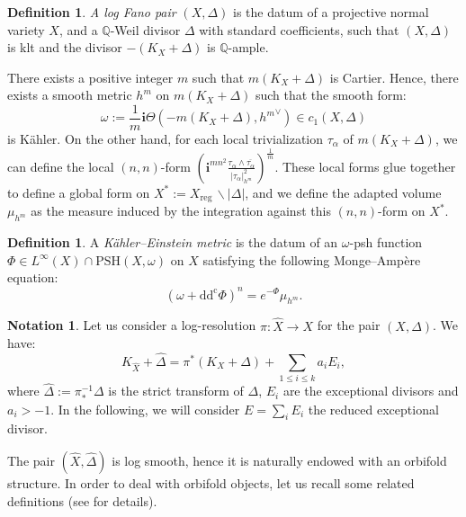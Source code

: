 \documentclass[12pt,a4paper]{amsart}
\newcommand{\Q}{\mathbb{Q}}
\newcommand{\reg}{\mathrm{reg}\,}
\newcommand{\ddc}{\mathrm{dd^c}}
\theoremstyle{plain}
\theoremstyle{definition}
\newtheorem{defi}[theo]{Definition}
\newtheorem{nota}[theo]{Notation}
\begin{document}
\begin{defi}
    \emph{A log Fano pair} $(X, \Delta)$ is the datum of a projective normal variety $X$, and a $\Q$-Weil divisor $\Delta$ with standard coefficients, such that $(X, \Delta)$ is klt and the divisor $-(K_X + \Delta)$ is $\Q$-ample.
\end{defi}

There exists a positive integer $m$ such that $m(K_X + \Delta)$ is Cartier.
Hence, there exists a smooth metric $h^m$ on $m(K_X + \Delta)$ such that the smooth form:
$$
\omega := \frac{1}{m} \textbf{i}\Theta(-m(K_X + \Delta), {h^m}^\vee) \in c_1(X, \Delta)
$$
is K\"ahler. On the other hand, for each local trivialization $\tau_\alpha$ of $m(K_X + \Delta)$, we can define the local $(n,n)$-form $\displaystyle \left(\textbf{i}^{mn^2}\frac{\tau_\alpha \wedge \overline{\tau_\alpha}}{|\tau_\alpha|_{h^m}^2} \right)^{\frac{1}{m}}$. These local forms glue together to define a global form on $X^* := X_\reg \backslash |\Delta|$, and we define the adapted volume $\mu_{h^m}$ as the measure induced by the integration against this $(n,n)$-form on $X^*$.

\begin{defi}
    A \emph{K\"ahler--Einstein metric} is the datum of an $\omega$-psh function $\Phi \in L^\infty(X) \cap \mathrm{PSH}(X, \omega)$ on $X$ satisfying the following Monge--Ampère equation:
    \begin{equation}\label{KE}
    \left( \omega + \ddc \Phi \right)^n = e^{-\Phi} \mu_{h^m}.
    \end{equation}
\end{defi}


\begin{nota}
    Let us consider a log-resolution $\pi : \widehat{X} \longrightarrow X$ for the pair $(X, \Delta)$. We have:
    $$
    K_{\widehat{X}} + \widehat{\Delta} = \pi^*(K_X + \Delta) + \sum_{1 \leq i \leq k} a_i E_i,
    $$
    where $\widehat{\Delta} := \pi^{-1}_* \Delta$ is the strict transform of $\Delta$, $E_i$ are the exceptional divisors and $a_i > -1$. In the following, we will consider $E = \sum_i E_i$ the reduced exceptional divisor. 
\end{nota}

The pair $(\widehat{X}, \widehat{\Delta})$ is log smooth, hence it is naturally endowed with an orbifold structure. In order to deal with orbifold objects, let us recall some related definitions (see \cite[Sect.~2]{Dai25} for details).
\end{document}
